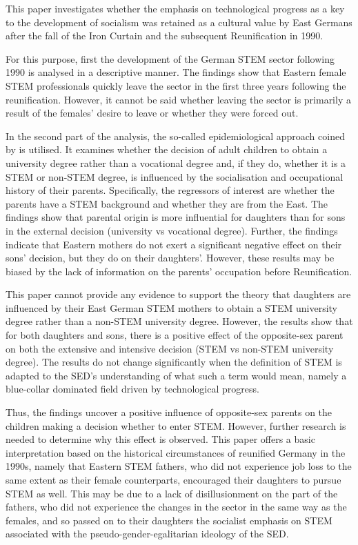 \documentclass[a4paper, oneside, hyperfootnotes = false]{article}
\begin{document}
{This paper investigates whether the emphasis on technological progress as a key to the development of socialism was retained as a cultural value by East Germans after the fall of the Iron Curtain and the subsequent Reunification in 1990.

For this purpose, first the development of the German STEM sector following 1990 is analysed in a descriptive manner.
The findings show that Eastern female STEM professionals quickly leave the sector in the first three years following the reunification.
However, it cannot be said whether leaving the sector is primarily a result of the females' desire to leave or whether they were forced out.

In the second part of the analysis, the so-called epidemiological approach coined by \cite{Fernandez2011} is utilised.
It examines whether the decision of adult children to obtain a university degree rather than a vocational degree and, if they do, whether it is a STEM or non-STEM degree, is influenced by the socialisation and occupational history of their parents.
Specifically, the regressors of interest are whether the parents have a STEM background and whether they are from the East.
The findings show that parental origin is more influential for daughters than for sons in the external decision (university vs vocational degree).
Further, the findings indicate that Eastern mothers do not exert a significant negative effect on their sons' decision, but they do on their daughters'.
However, these results may be biased by the lack of information on the parents' occupation before Reunification.

This paper cannot provide any evidence to support the theory that daughters are influenced by their East German STEM mothers to obtain a STEM university degree rather than a non-STEM university degree.
However, the results show that for both daughters and sons, there is a positive effect of the opposite-sex parent on both the extensive and intensive decision (STEM vs non-STEM university degree).
The results do not change significantly when the definition of STEM is adapted to the SED's understanding of what such a term would mean, namely a blue-collar dominated field driven by technological progress.

Thus, the findings uncover a positive influence of opposite-sex parents on the children making a decision whether to enter STEM.
However, further research is needed to determine why this effect is observed.
This paper offers a basic interpretation based on the historical circumstances of reunified Germany in the 1990s, namely that Eastern STEM fathers, who did not experience job loss to the same extent as their female counterparts, encouraged their daughters to pursue STEM as well.
This may be due to a lack of disillusionment on the part of the fathers, who did not experience the changes in the sector in the same way as the females, and so passed on to their daughters the socialist emphasis on STEM associated with the pseudo-gender-egalitarian ideology of the SED.

}
\end{document}

